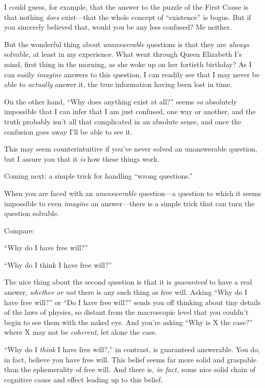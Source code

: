 {
 I could guess, for example, that the answer to the puzzle of the
First Cause is that nothing \textit{does} exist---that the whole
concept of ``existence'' is bogus.
But if you sincerely believed that, would you be any less confused? Me
neither.}

{
 But the wonderful thing about \textit{unanswerable} questions is
that they are \textit{always} solvable, at least in my experience. What
went through Queen Elizabeth I's mind, first thing in
the morning, as she woke up on her fortieth birthday? As I can easily
\textit{imagine} answers to this question, I can readily see that I may
never be able to \textit{actually} answer it, the true information
having been lost in time.}

{
 On the other hand, ``Why does anything exist at
all?'' seems \textit{so} absolutely impossible that I
can infer that I am just confused, one way or another, and the truth
probably isn't all that complicated in an absolute
sense, and once the confusion goes away I'll be able to
see it.}

{
 This may seem counterintuitive if you've never
solved an unanswerable question, but I assure you that it \textit{is}
how these things work.}

{
 Coming next: a simple trick for handling ``wrong
questions.''}

\myendsectiontext


{
 When you are faced with an \textit{unanswerable} question---a
question to which it seems impossible to even \textit{imagine} an
answer---there is a simple trick that can turn the question solvable. }

{
 Compare:}

{
 ``Why do I have free will?''}

{
 ``Why do I think I have free
will?''}

{
 The nice thing about the second question is that it is
\textit{guaranteed} to have a real answer, \textit{whether or not}
there is any such thing as free will. Asking ``Why do
I have free will?'' or ``Do I have
free will?'' sends you off thinking about tiny
details of the laws of physics, so distant from the macroscopic level
that you couldn't begin to see them with the naked eye.
And you're asking ``Why is X the
case?'' where X may not be \textit{coherent}, let
alone the case.}

{
 ``Why do I \textit{think} I have free
will?,'' in contrast, is guaranteed answerable. You
do, in fact, believe you have free will. This belief seems far more
solid and graspable than the ephemerality of free will. And there is,
\textit{in fact,} some nice solid chain of cognitive cause and effect
leading up to this belief.}

